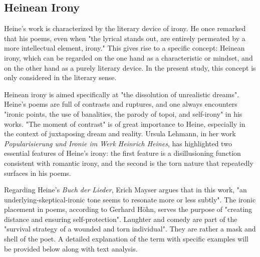\documentclass[10pt,a4paper,onecolumn]{rho}
\begin{document}
\subsection{Heinean Irony}
Heine's work is characterized by the literary device of irony. He once remarked that his poems, even when "the lyrical stands out, are entirely permeated by a more intellectual element, irony." This gives rise to a specific concept: Heinean irony, which can be regarded on the one hand as a characteristic or mindset, and on the other hand as a purely literary device. In the present study, this concept is only considered in the literary sense.

Heinean irony is aimed specifically at "the dissolution of unrealistic dreams". Heine's poems are full of contrasts and ruptures, and one always encounters "ironic points, the use of banalities, the parody of topoi, and self-irony" in his works. "The moment of contrast" is of great importance to Heine, especially in the context of juxtaposing dream and reality. Ursula Lehmann, in her work \textit{Popularisierung und Ironie im Werk Heinrich Heines}, has highlighted two essential features of Heine's irony: the first feature is a disillusioning function consistent with romantic irony, and the second is the torn nature that repeatedly surfaces in his poems.

Regarding Heine's \textit{Buch der Lieder}, Erich Mayser argues that in this work, "an underlying-skeptical-ironic tone seems to resonate more or less subtly". The ironic placement in poems, according to Gerhard Höhn, serves the purpose of "creating distance and ensuring self-protection". Laughter and comedy are part of the "survival strategy of a wounded and torn individual". They are rather a mask and shell of the poet. A detailed explanation of the term with specific examples will be provided below along with text analysis.

\printbibliography[title={REFERENCES}]

\end{document}
